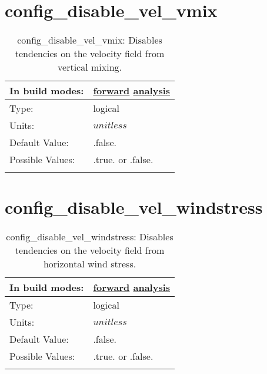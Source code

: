\section[config\_disable\_vel\_vmix]{config\_disable\_vel\_vmix}
\label{sec:nm_sec_config_disable_vel_vmix}
\begin{center}
\begin{longtable}{| p{2.0in} || p{4.0in} |}
    \hline
    In build modes: & \hyperref[subsec:forward_nm_tab_debug]{forward} \hyperref[subsec:analysis_nm_tab_debug]{analysis} \\
    \hline
    Type: & logical \\
    \hline
    Units: & $unitless$ \\
    \hline
    Default Value: & .false. \\
    \hline
    Possible Values: & .true. or .false. \\
    \hline
    \caption{config\_disable\_vel\_vmix: Disables tendencies on the velocity field from vertical mixing.}
\end{longtable}
\end{center}
\section[config\_disable\_vel\_windstress]{config\_disable\_vel\_windstress}
\label{sec:nm_sec_config_disable_vel_windstress}
\begin{center}
\begin{longtable}{| p{2.0in} || p{4.0in} |}
    \hline
    In build modes: & \hyperref[subsec:forward_nm_tab_debug]{forward} \hyperref[subsec:analysis_nm_tab_debug]{analysis} \\
    \hline
    Type: & logical \\
    \hline
    Units: & $unitless$ \\
    \hline
    Default Value: & .false. \\
    \hline
    Possible Values: & .true. or .false. \\
    \hline
    \caption{config\_disable\_vel\_windstress: Disables tendencies on the velocity field from horizontal wind stress.}
\end{longtable}
\end{center}
